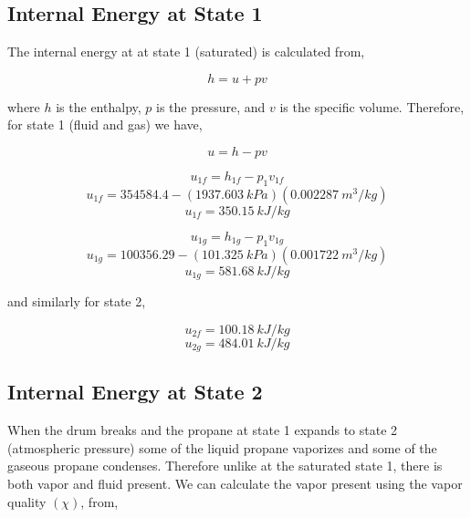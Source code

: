 \documentclass[10pt,parskip=half,
toc=sectionentrywithdots,
bibliography=totocnumbered,
captions=tableheading,numbers=noendperiod]{scrartcl}
\begin{document}
\hypertarget{internal-energy-at-state-1}{%
\subsection{Internal Energy at State
1}\label{internal-energy-at-state-1}}

The internal energy at at state 1 (saturated) is calculated from,

\begin{equation}h = u + pv\end{equation}

where \(h\) is the enthalpy, \(p\) is the pressure, and \(v\) is the
specific volume. Therefore, for state 1 (fluid and gas) we have,

\begin{equation}u = h - pv\end{equation}

\begin{equation}u_{1f} = h_{1f} - p_1v_{1f}\end{equation}
\begin{equation}u_{1f} = 354584.4 - (1937.603\:kPa)(0.002287\:m^3/kg)\end{equation}
\begin{equation}u_{1f} = 350.15\:kJ/kg\end{equation}

\begin{equation}u_{1g} = h_{1g} - p_1v_{1g}\end{equation}
\begin{equation}u_{1g} = 100356.29 - (101.325\:kPa)(0.001722\:m^3/kg)\end{equation}
\begin{equation}u_{1g} = 581.68\:kJ/kg\end{equation}

and similarly for state 2,

\begin{equation}u_{2f} = 100.18\:kJ/kg\end{equation}
\begin{equation}u_{2g} = 484.01\:kJ/kg\end{equation}

\hypertarget{internal-energy-at-state-2}{%
\subsection{Internal Energy at State
2}\label{internal-energy-at-state-2}}

When the drum breaks and the propane at state 1 expands to state 2
(atmospheric pressure) some of the liquid propane vaporizes and some of
the gaseous propane condenses. Therefore unlike at the saturated state
1, there is both vapor and fluid present. We can calculate the vapor
present using the vapor quality \((\chi)\), from,
\end{document}
